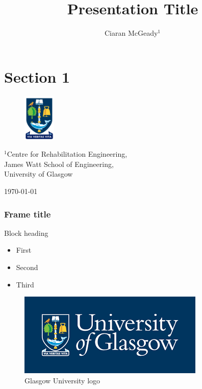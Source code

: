 \documentclass[usenames,dvipsnames, 8pt]{beamer}
\begin{document}
\section{Section 1}
\title{Presentation Title}
\author{\large Ciaran McGeady$^1$}
\date{}
\begin{frame}
\begin{figure}
    \centering
    \includegraphics[height=2.25cm]{Figs/Uni_arms.png}
\end{figure}
\vspace{-0.8cm}
\maketitle
\vspace{-1.9cm}
\begin{center}
{\small {}$^1$Centre for Rehabilitation Engineering, \\ James Watt School of Engineering, \\University of Glasgow} \\
\end{center}
\begin{center}
{\small\today}\\
\end{center}
\end{frame}

\begin{frame}
\frametitle{Frame title}
\begin{block}{Block heading} %
\begin{itemize}
    \item First
    \item Second 
    \item Third
\end{itemize}
\end{block}
\pause %
\begin{figure}
    \centering
    \includegraphics[width=0.5\linewidth]{Figs/uofg.png}
    \caption{Glasgow University logo}
\end{figure}
\end{frame}
\end{document}
